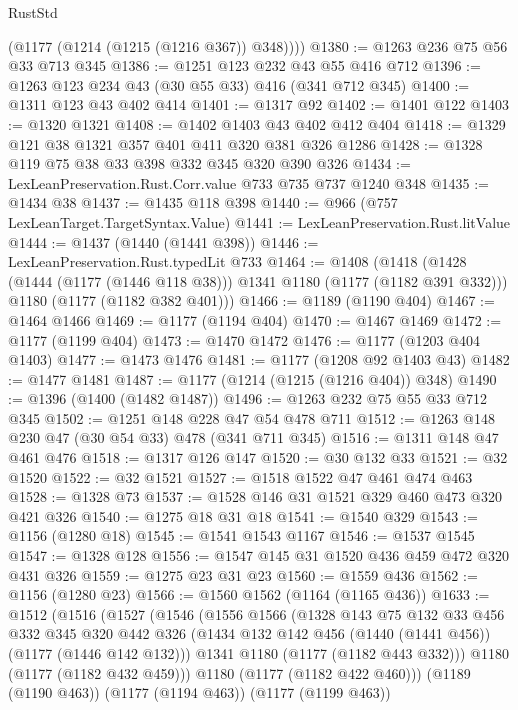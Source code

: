 \begin{lexlean}{RustStd}
\begin{coremodule}
{\begin{coremodule}
{{{{{        (@1177 (@1214 (@1215 (@1216 @367)) @348))))
@1380 := @1263 @236 @75 @56 @33 @713 @345
@1386 := @1251 @123 @232 @43 @55 @416 @712
@1396 := @1263 @123 @234 @43 (@30 @55 @33) @416 (@341 @712 @345)
@1400 := @1311 @123 @43 @402 @414
@1401 := @1317 @92
@1402 := @1401 @122
@1403 := @1320 @1321
@1408 := @1402 @1403 @43 @402 @412 @404
@1418 := @1329 @121 @38 @1321 @357 @401 @411 @320 @381 @326 @1286
@1428 := @1328 @119 @75 @38 @33 @398 @332 @345 @320 @390 @326
@1434 := LexLeanPreservation.Rust.Corr.value @733 @735 @737 @1240 @348
@1435 := @1434 @38
@1437 := @1435 @118 @398
@1440 := @966 (@757 LexLeanTarget.TargetSyntax.Value)
@1441 := LexLeanPreservation.Rust.litValue
@1444 := @1437 (@1440 (@1441 @398))
@1446 := LexLeanPreservation.Rust.typedLit @733
@1464 := @1408
    (@1418
      (@1428 (@1444 (@1177 (@1446 @118 @38))) @1341 @1180 (@1177 (@1182 @391 @332)))
      @1180
      (@1177 (@1182 @382 @401)))
@1466 := @1189 (@1190 @404)
@1467 := @1464 @1466
@1469 := @1177 (@1194 @404)
@1470 := @1467 @1469
@1472 := @1177 (@1199 @404)
@1473 := @1470 @1472
@1476 := @1177 (@1203 @404 @1403)
@1477 := @1473 @1476
@1481 := @1177 (@1208 @92 @1403 @43)
@1482 := @1477 @1481
@1487 := @1177 (@1214 (@1215 (@1216 @404)) @348)
@1490 := @1396 (@1400 (@1482 @1487))
@1496 := @1263 @232 @75 @55 @33 @712 @345
@1502 := @1251 @148 @228 @47 @54 @478 @711
@1512 := @1263 @148 @230 @47 (@30 @54 @33) @478 (@341 @711 @345)
@1516 := @1311 @148 @47 @461 @476
@1518 := @1317 @126 @147
@1520 := @30 @132 @33
@1521 := @32 @1520
@1522 := @32 @1521
@1527 := @1518 @1522 @47 @461 @474 @463
@1528 := @1328 @73
@1537 := @1528 @146 @31 @1521 @329 @460 @473 @320 @421 @326
@1540 := @1275 @18 @31 @18
@1541 := @1540 @329
@1543 := @1156 (@1280 @18)
@1545 := @1541 @1543 @1167
@1546 := @1537 @1545
@1547 := @1328 @128
@1556 := @1547 @145 @31 @1520 @436 @459 @472 @320 @431 @326
@1559 := @1275 @23 @31 @23
@1560 := @1559 @436
@1562 := @1156 (@1280 @23)
@1566 := @1560 @1562 (@1164 (@1165 @436))
@1633 := @1512
    (@1516
      (@1527
        (@1546
          (@1556
            @1566
            (@1328
              @143
              @75
              @132
              @33
              @456
              @332
              @345
              @320
              @442
              @326
              (@1434 @132 @142 @456 (@1440 (@1441 @456)) (@1177 (@1446 @142 @132)))
              @1341
              @1180
              (@1177 (@1182 @443 @332)))
            @1180
            (@1177 (@1182 @432 @459)))
          @1180
          (@1177 (@1182 @422 @460)))
        (@1189 (@1190 @463))
        (@1177 (@1194 @463))
        (@1177 (@1199 @463))
}}}}}
\end{coremodule}}
\end{coremodule}
\end{lexlean}
